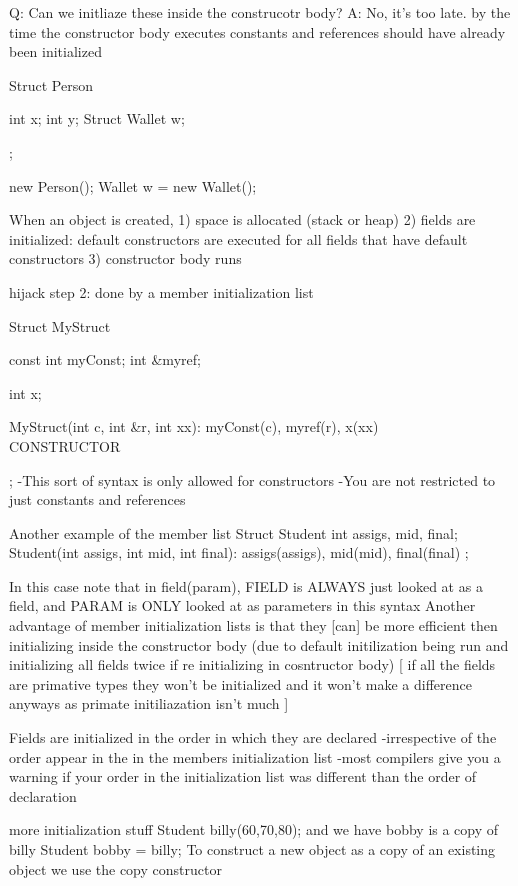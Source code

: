 \documentclass[12pt,oneside,fleqn]{book}
\begin{document}
{{Q: Can we initliaze these inside the construcotr body?
A: No, it's too late. by the time the constructor body executes constants and references should have already been initialized




Struct Person {

	int x;
	int y;
	Struct Wallet w;
	

};

new Person();
Wallet w = new Wallet();



When an object is created,
1) space is allocated (stack or heap)
2) fields are initialized: default constructors are executed for all fields that have default constructors
3) constructor body runs

hijack step 2:
done by a member initialization list

Struct MyStruct {
	const int myConst;
	int \&myref;
	
	int x;
	
	MyStruct(int c, int \&r, int xx): myConst(c), myref(r), x(xx) {
	~~~~ CONSTRUCTOR ~~~~
	}
};
-This sort of syntax is only allowed for constructors
-You are not restricted to just constants and references

Another example of the member list
Struct Student{
	int assigs, mid, final;
	Student(int assigs, int mid, int final): assigs(assigs), mid(mid), final(final) {
	}
};

In this case note that in field(param), FIELD is ALWAYS just looked at as a field, and PARAM is ONLY looked at as parameters in this syntax
Another advantage of member initialization lists is that they [can] be more efficient then initializing inside the constructor body (due to default initilization being run and initializing all fields twice if re initializing in cosntructor body)
[ if all the fields are primative types they won't be initialized and it won't make a difference anyways as primate initiliazation isn't much ]

Fields are initialized in the order in which they are declared
-irrespective of the order appear in the in the members initialization list
-most compilers give you a warning if your order in the initialization list was different than the order of declaration


more initialization stuff
Student billy(60,70,80);
and we have bobby is a copy of billy
Student bobby = billy;
To construct a new object as a copy of an existing object we use the copy constructor

}}
\end{document}
